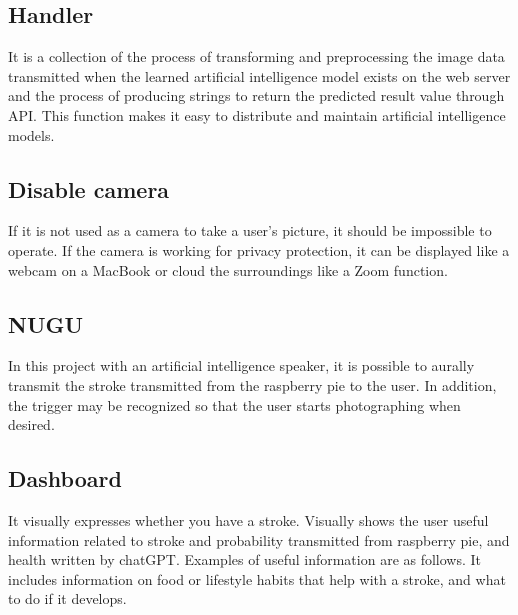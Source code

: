 \subsection{Handler}
It is a collection of the process of transforming and preprocessing the image data transmitted when the learned artificial intelligence model exists on the web server and the process of producing strings to return the predicted result value through API. This function makes it easy to distribute and maintain artificial intelligence models.

\subsection{Disable camera}
If it is not used as a camera to take a user's picture, it should be impossible to operate. If the camera is working for privacy protection, it can be displayed like a webcam on a MacBook or cloud the surroundings like a Zoom function.

\subsection{NUGU}
In this project with an artificial intelligence speaker, it is possible to aurally transmit the stroke transmitted from the raspberry pie to the user. In addition, the trigger may be recognized so that the user starts photographing when desired.

\subsection{Dashboard}
It visually expresses whether you have a stroke. Visually shows the user useful information related to stroke and probability transmitted from raspberry pie, and health written by chatGPT. Examples of useful information are as follows. It includes information on food or lifestyle habits that help with a stroke, and what to do if it develops.
